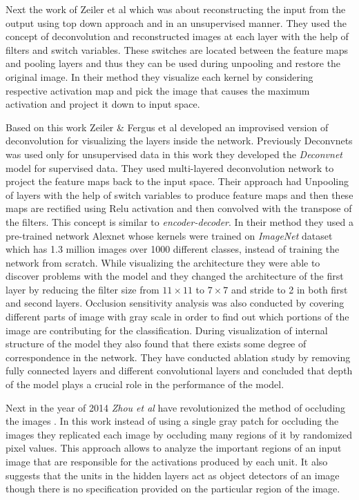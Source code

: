 Next the work of Zeiler et al \cite{zeiler11} which was about reconstructing the input from the output using top down approach and in an unsupervised manner. They used the concept of deconvolution and reconstructed images at each layer with the help of filters and switch variables. These switches are located between the feature maps and pooling layers and thus they can be used during unpooling and restore the original image.  In their method they visualize each kernel by considering respective activation map and pick the image that causes the maximum activation and project it down to input space. 


Based on this work Zeiler \& Fergus et al\cite{zeiler13} developed an improvised version of deconvolution for visualizing the layers inside the network. Previously Deconvnets was used only for unsupervised data in this work they developed the \textit{Deconvnet} model for supervised data. They used multi-layered deconvolution network to project the feature maps back to the input space. Their approach had Unpooling of layers with the help of switch variables to produce feature maps and then these maps are rectified using Relu activation and then convolved with the transpose of the filters. This concept is similar to \textit{encoder-decoder}. In their method they used a pre-trained network Alexnet\cite{Krizhevsky} whose kernels were trained on \textit{ImageNet} dataset which has 1.3 million images over 1000 different classes, instead of training the network from scratch. While visualizing the architecture they were able to discover problems with the model and they changed the architecture of the first layer by reducing the filter size from $11\times 11$ to $7\times7 $ and stride to 2 in both first and second layers. Occlusion sensitivity analysis was also conducted by covering different parts of image with gray scale in order to find out which portions of the image are contributing for the classification. During visualization of internal structure of the model they also found that there exists some degree of correspondence in the network. They have conducted ablation study by removing fully connected layers and different convolutional layers and concluded that depth of the model plays a crucial role in the performance of the model. 

Next in the year of 2014 \textit{Zhou et al}\cite{Zhou14} have revolutionized the method of occluding the images \cite{zeiler13}. In this work instead of using a single gray patch for occluding the images they replicated each image by occluding many regions of it by randomized pixel values. This approach allows to analyze the important regions of an input image that are responsible for the activations produced by each unit. It also suggests that the units in the hidden layers act as object detectors of an image though there is no specification provided on the particular region of the image.

